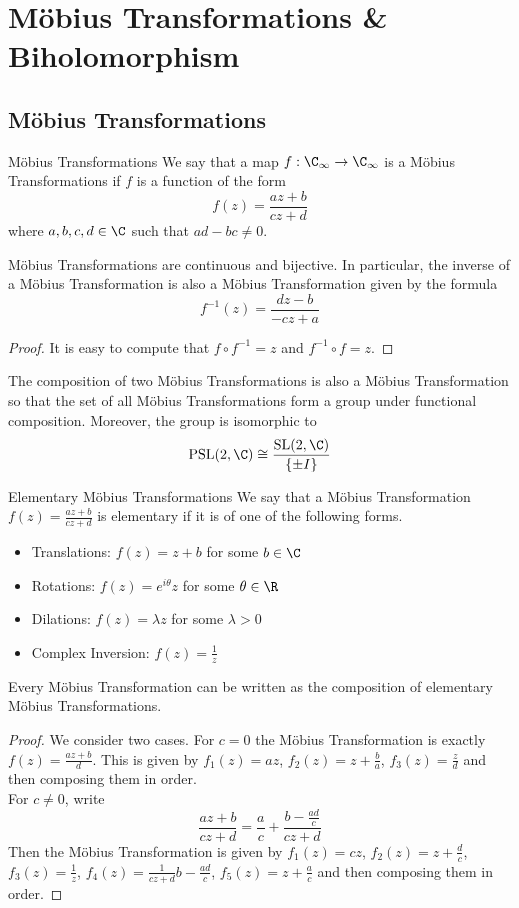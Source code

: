 \documentclass[a4paper]{article}
\begin{document}
\pagebreak
\section{Möbius Transformations \& Biholomorphism}
\subsection{Möbius Transformations}
\begin{defn}{Möbius Transformations}{} We say that a map $f:\C_\infty\to\C_\infty$ is a Möbius Transformations if $f$ is a function of the form $$f(z)=\frac{az+b}{cz+d}$$ where $a,b,c,d\in\C$ such that $ad-bc\neq 0$. 
\end{defn}

\begin{prp}{}{} Möbius Transformations are continuous and bijective. In particular, the inverse of a Möbius Transformation is also a Möbius Transformation given by the formula $$f^{-1}(z)=\frac{dz-b}{-cz+a}$$ 
\begin{proof}
It is easy to compute that $f\circ f^{-1}=z$ and $f^{-1}\circ f=z$. 
\end{proof}
\end{prp}

\begin{prp}{}{} The composition of two Möbius Transformations is also a Möbius Transformation so that the set of all Möbius Transformations form a group under functional composition. Moreover, the group is isomorphic to $$\text{PSL}(2,\C)\cong\frac{\text{SL}(2,\C)}{\{\pm I\}}$$
\end{prp}

\begin{defn}{Elementary Möbius Transformations}{} We say that a Möbius Transformation $f(z)=\frac{az+b}{cz+d}$ is elementary if it is of one of the following forms. 
\begin{itemize}
\item Translations: $f(z)=z+b$ for some $b\in\C$
\item Rotations: $f(z)=e^{i\theta}z$ for some $\theta\in\R$
\item Dilations: $f(z)=\lambda z$ for some $\lambda>0$
\item Complex Inversion: $f(z)=\frac{1}{z}$
\end{itemize}
\end{defn}

\begin{lmm}{}{} Every Möbius Transformation can be written as the composition of elementary Möbius Transformations. 
\begin{proof}
We consider two cases. For $c=0$ the Möbius Transformation is exactly $f(z)=\frac{az+b}{d}$. This is given by $f_1(z)=az$, $f_2(z)=z+\frac{b}{a}$, $f_3(z)=\frac{z}{d}$ and then composing them in order. \\
For $c\neq 0$, write $$\frac{az+b}{cz+d}=\frac{a}{c}+\frac{b-\frac{ad}{c}}{cz+d}$$ Then the Möbius Transformation is given by $f_1(z)=cz$, $f_2(z)=z+\frac{d}{c}$, $f_3(z)=\frac{1}{z}$, $f_4(z)=\frac{1}{cz+d}b-\frac{ad}{c}$, $f_5(z)=z+\frac{a}{c}$ and then composing them in order. 
\end{proof}
\end{lmm}
\end{document}

